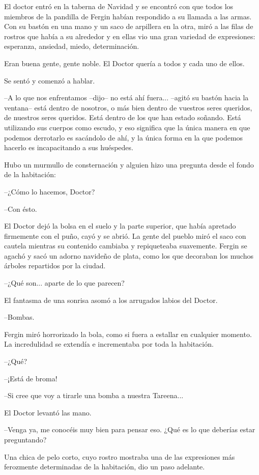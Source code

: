 El doctor entró en la taberna de Navidad y se encontró con que todos los miembros de la pandilla de Fergin habían respondido a su llamada a las armas. Con su bastón en una mano y un saco de arpillera en la otra, miró a las filas de rostros que había a su alrededor y en ellas vio una gran variedad de expresiones: esperanza, ansiedad, miedo, determinación.

Eran buena gente, gente noble. El Doctor quería a todos y cada uno de ellos.

Se sentó y comenzó a hablar.

--A lo que nos enfrentamos --dijo-- no está ahí fuera... --agitó su bastón hacia la ventana-- está dentro de nosotros, o más bien dentro de vuestros seres queridos, de nuestros seres queridos. Está dentro de los que han estado soñando. Está utilizando sus cuerpos como escudo, y eso significa que la única manera en que podemos derrotarlo es sacándolo de ahí, y la única forma en la que podemos hacerlo es incapacitando a sus huéspedes.

Hubo un murmullo de consternación y alguien hizo una pregunta desde el fondo de la habitación:

--¿Cómo lo hacemos, Doctor?

--Con ésto.

El Doctor dejó la bolsa en el suelo y la parte superior, que había apretado firmemente con el puño, cayó y se abrió. La gente del pueblo miró el saco con cautela mientras su contenido cambiaba y repiqueteaba suavemente. Fergin se agachó y sacó un adorno navideño de plata, como los que decoraban los muchos árboles repartidos por la ciudad.

--¿Qué son... aparte de lo que parecen?

El fantasma de una sonrisa asomó a los arrugados labios del Doctor.

--Bombas.

Fergin miró horrorizado la bola, como si fuera a estallar en cualquier momento. La incredulidad se extendía e incrementaba por toda la habitación.

--¿Qué?

--¡Está de broma!

--Si cree que voy a tirarle una bomba a nuestra Tareena...

El Doctor levantó las mano. 

--Venga ya, me conocéis muy bien para pensar eso. ¿Qué es lo que deberías estar preguntando?

Una chica de pelo corto, cuyo rostro mostraba una de las expresiones más ferozmente determinadas de la habitación, dio un paso adelante. 


